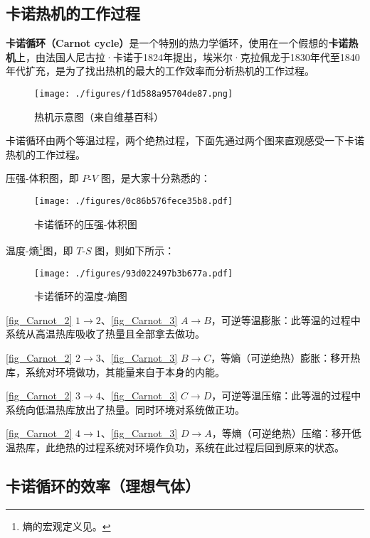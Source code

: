 
\subsection{卡诺热机的工作过程}
\textbf{卡诺循环（Carnot cycle）}是一个特别的热力学循环，使用在一个假想的\textbf{卡诺热机}上，由法国人尼古拉·卡诺于1824年提出，埃米尔·克拉佩龙于1830年代至1840年代扩充，是为了找出热机的最大的工作效率而分析热机的工作过程。

\begin{figure}[ht]
\centering
\texttt{[image: ./figures/f1d588a95704de87.png]}
\caption{热机示意图（来自维基百科）} \label{fig_Carnot_1}
\end{figure}
卡诺循环由两个等温过程，两个绝热过程，下面先通过两个图来直观感受一下卡诺热机的工作过程。

压强-体积图，即 $P$-$V$ 图，是大家十分熟悉的：
\begin{figure}[ht]
\centering
\texttt{[image: ./figures/0c86b576fece35b8.pdf]}
\caption{卡诺循环的压强-体积图} \label{fig_Carnot_2}
\end{figure}
温度-熵\footnote{熵的宏观定义见。}图，即 $T$-$S$ 图，则如下所示：
\begin{figure}[ht]
\centering
\texttt{[image: ./figures/93d022497b3b677a.pdf]}
\caption{卡诺循环的温度-熵图} \label{fig_Carnot_3}
\end{figure}

\autoref{fig_Carnot_2} $1\to 2$、\autoref{fig_Carnot_3} $A\to B$，可逆等温膨胀：此等温的过程中系统从高温热库吸收了热量且全部拿去做功。

\autoref{fig_Carnot_2} $2\to 3$、\autoref{fig_Carnot_3} $B\to C$，等熵（可逆绝热）膨胀：移开热库，系统对环境做功，其能量来自于本身的内能。

\autoref{fig_Carnot_2} $3\to 4$、\autoref{fig_Carnot_3} $C\to D$，可逆等温压缩：此等温的过程中系统向低温热库放出了热量。同时环境对系统做正功。

\autoref{fig_Carnot_2} $4\to 1$、\autoref{fig_Carnot_3} $D\to A$，等熵（可逆绝热）压缩：移开低温热库，此绝热的过程系统对环境作负功，系统在此过程后回到原来的状态。

\subsection{卡诺循环的效率（理想气体）}

